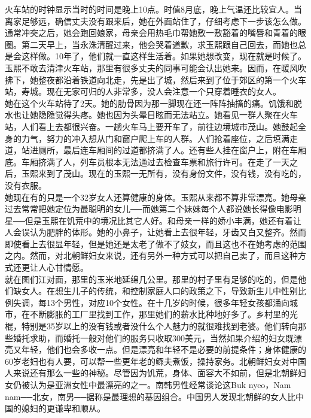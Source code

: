 火车站的时钟显示当时的时间是晚上10点。时值8月底，晚上气温还比较宜人。当离家足够远，确信丈夫没有跟来后，她在外面站住了，仔细考虑下一步该怎么做。通常冲突之后，她会跑回娘家，母亲会用热毛巾帮她敷一敷豁着的嘴唇和青着的眼圈。第二天早上，当永洙清醒过来，他会哭着道歉，求玉熙跟自己回去，而她也总是会这样做。10年了，他们就一直这样生活着。如果她想改变，现在就是时候了。\\

玉熙不敢去清津火车站，那里有很多丈夫的同事可能会认出她来。因而，在暖风吹拂下，她整夜都沿着铁道向北走，先是出了城，然后来到了位于郊区的第一个火车站，寿城。现在无家可归的人非常多，没人会注意一个只穿着睡衣的女人。\\

她在这个火车站待了2天。她的肋骨因为那一脚现在还一阵阵抽搐的痛。饥饿和脱水也让她隐隐觉得头疼。她也因为头晕目眩而无法站立。她看见一群人聚在火车站，人们看上去都很兴奋。一趟火车马上要开车了，前往边境城市茂山。她鼓起全身的力气，努力的冲入想从门和窗户爬上车的人群。人们抢着座位，之后填满走道，站进厕所，最后连车厢间的过道都挤满了人。还有些人挂在窗户上，附在车厢底。车厢挤满了人，列车员根本无法通过去检查车票和旅行许可。在走了一天之后，玉熙来到了茂山。现在的玉熙一无所有，没有身份文件，没有钱，没有吃的，没有衣服。\\

她现在有的只是一个32岁女人还算健康的身体。玉熙从来都不算非常漂亮。她母亲过去常常把她定位为最聪明的女儿──而她第二个妹妹每个人都说她长得像电影明星──但是玉熙在饥荒中的境况比其它人好。和母亲一样的娇小丰满，她还有着让人会误认为肥胖的体形。她的小鼻子，让她看上去很年轻，牙齿又白又整齐。然而即使看上去很显年轻，但是她还是太老了做不了妓女，而且这也不在她考虑的范围之内。然而，对北朝鲜妇女来说，还有另外一种方式可以把自己卖了，而且这种方式还更让人心甘情愿。\\

就在图们江对面，那里的玉米地延绵几公里。那里的村子里有足够的吃的，但是他们缺女人。在想生儿子的传统，和控制家庭人口的政策之下，导致新生儿中性别比例失调，每13个男性，对应10个女性。在十几岁的时候，很多年轻女孩都涌向城市，在不断膨胀的工厂里找到工作，那里她们的薪水比种地好多了。乡村里的光棍，特别是35岁以上的没有钱或者没什么个人魅力的就很难找到老婆。他们转向那些婚托求助，而婚托一般对他们的服务只收取300美元，当然如果介绍的妇女既漂亮又年轻，他们也会多收一点。但是漂亮和年轻不是必要的前提条件；身体健康的60岁老妇也有人要，可以帮一些更年老的鳏夫煮饭，操持家务。北朝鲜妇女对中国人来说还有那么一些的神秘。尽管因为饥荒，身体、面容大不如前，但是北朝鲜妇女仍被认为是亚洲女性中最漂亮的之一。南韩男性经常谈论这Buk nyeo，Nam nam──北女，南男──据称是最理想的基因组合。中国男人发现北朝鲜的女人比中国的媳妇的更谦卑和顺从。\\

